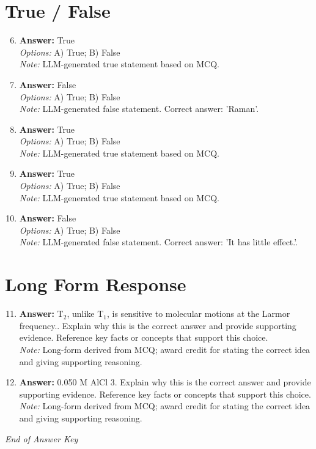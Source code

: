 \documentclass[12pt]{article}
\begin{document}
\section*{True / False}
\begin{enumerate}[label=\arabic*.]
\setcounter{enumi}{5}
\item \textbf{Answer:} True
\\ \textit{Options:} A) True; B) False
\\ \textit{Note:} LLM-generated true statement based on MCQ.
\item \textbf{Answer:} False
\\ \textit{Options:} A) True; B) False
\\ \textit{Note:} LLM-generated false statement. Correct answer: 'Raman'.
\item \textbf{Answer:} True
\\ \textit{Options:} A) True; B) False
\\ \textit{Note:} LLM-generated true statement based on MCQ.
\item \textbf{Answer:} True
\\ \textit{Options:} A) True; B) False
\\ \textit{Note:} LLM-generated true statement based on MCQ.
\item \textbf{Answer:} False
\\ \textit{Options:} A) True; B) False
\\ \textit{Note:} LLM-generated false statement. Correct answer: 'It has little effect.'.
\end{enumerate}

\section*{Long Form Response}
\begin{enumerate}[label=\arabic*.]
\setcounter{enumi}{10}
\item \textbf{Answer:} T$_{2}$, unlike T$_{1}$, is sensitive to molecular motions at the Larmor frequency.. Explain why this is the correct answer and provide supporting evidence. Reference key facts or concepts that support this choice.
\\ \textit{Note:} Long-form derived from MCQ; award credit for stating the correct idea and giving supporting reasoning.
\item \textbf{Answer:} 0.050 M AlCl 3. Explain why this is the correct answer and provide supporting evidence. Reference key facts or concepts that support this choice.
\\ \textit{Note:} Long-form derived from MCQ; award credit for stating the correct idea and giving supporting reasoning.
\end{enumerate}

\vfill
\noindent\textit{End of Answer Key}
\end{document}
